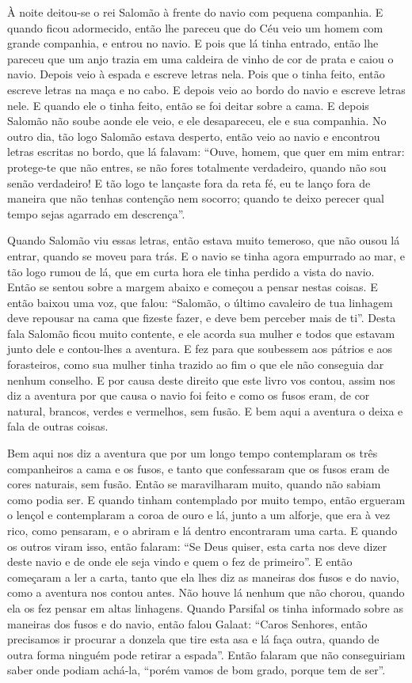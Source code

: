 À noite deitou-se o rei Salomão à frente do navio com pequena companhia. E
quando ficou adormecido, então lhe pareceu que do Céu veio um homem com grande
companhia, e entrou no navio. E pois que lá tinha entrado, então lhe pareceu
que um anjo trazia em  uma caldeira de vinho de cor de prata e caiou o navio.
Depois veio à espada e escreve letras nela. Pois que o tinha feito, então
escreve letras na maça e no cabo. E depois veio ao bordo do navio e escreve
letras nele. E quando ele o tinha feito, então se foi deitar sobre a cama. E
depois Salomão não soube aonde ele veio, e ele desapareceu, ele e sua companhia. 
No outro dia, tão logo Salomão estava desperto, então veio ao navio e
encontrou letras escritas no bordo, que lá falavam: ``Ouve, homem, que quer em
mim entrar: protege-te que não entres, se não fores totalmente verdadeiro,
quando não sou senão verdadeiro! E tão logo te lançaste fora da reta fé, eu te
lanço fora de maneira que não tenhas contenção nem socorro; quando te deixo
perecer qual tempo sejas agarrado em descrença”.

Quando Salomão viu essas letras, então estava muito temeroso, que não ousou lá
entrar, quando se moveu para trás. E o navio se tinha agora empurrado ao mar, e
tão logo rumou de lá, que em curta hora ele tinha perdido a vista do navio.
Então se sentou sobre a margem abaixo e começou a pensar nestas coisas. E então
baixou uma voz, que falou: “Salomão, o último cavaleiro de tua linhagem deve
repousar na cama que fizeste fazer, e deve bem perceber mais de ti”.
Desta fala Salomão ficou muito contente, e ele acorda sua mulher e todos que
estavam junto dele e contou-lhes a aventura. E fez para que soubessem aos
pátrios e aos forasteiros, como sua mulher tinha trazido ao fim o que ele não
conseguia dar nenhum conselho. E por causa deste direito que este livro vos
contou, assim nos diz a aventura por que causa o navio foi feito e como os
fusos eram, de cor natural, brancos, verdes e vermelhos, sem fusão. E bem aqui
a aventura o deixa e fala de outras coisas.

Bem aqui nos diz a aventura que por um longo tempo contemplaram os três
companheiros a cama e os fusos, e tanto que confessaram que os fusos eram de
cores naturais, sem fusão. Então se maravilharam muito, quando não sabiam como
podia ser. E quando tinham contemplado por muito tempo, então ergueram o lençol
e contemplaram a coroa de ouro e lá, junto a um alforje, que era à vez rico,
como pensaram, e o abriram e lá dentro encontraram uma carta. E quando os
outros viram isso, então falaram: “Se Deus quiser, esta carta nos deve dizer
deste navio e de onde ele seja vindo e quem o fez de primeiro”. E então
começaram a ler a carta, tanto que ela lhes diz as maneiras dos fusos e do
navio, como a aventura nos contou antes. Não houve lá nenhum que não chorou,
quando ela os fez pensar em altas linhagens. Quando Parsifal os tinha
informado sobre as maneiras dos fusos e do navio, então falou Galaat: “Caros
Senhores, então precisamos ir procurar a donzela que tire esta asa e lá faça
outra, quando de outra forma ninguém pode retirar a espada”. Então falaram que
não conseguiriam saber onde podiam achá-la, “porém vamos de bom grado, porque
tem de ser”.

